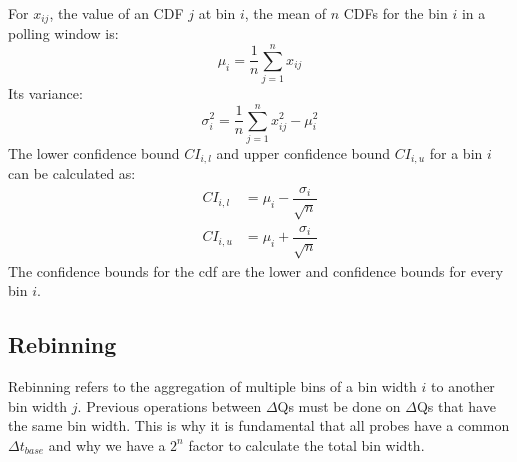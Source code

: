         For $x_{ij}$, the value of an CDF $j$ at bin $i$, the mean of $n$ CDFs for the bin $i$ in a polling window is:
            \begin{equation}
                \mu_i = \dfrac{1}{n} \sum_{j=1}^{n} x_{ij}
                \label{eq:mean_ecdf}
            \end{equation}
        Its variance:
            \begin{equation}
                \sigma^2_i = \dfrac{1}{n} \sum_{j=1}^{n} x^2_{ij} - \mu^2_i
                \label{eq:var_ecdf}
            \end{equation}
        The lower confidence bound $CI_{i, l}$ and upper confidence bound $CI_{i, u}$ for a bin $i$ can be calculated as:
        \begin{equation}
            \begin{split}
                CI_{i, l} &= \mu_i - \dfrac{\sigma_i}{\sqrt{n}} \\
                CI_{i, u} &= \mu_i + \dfrac{\sigma_i}{\sqrt{n}}
            \end{split}
            \label{eq:ci_i}
        \end{equation}
        The confidence bounds for the cdf are the lower and confidence bounds for every bin $i$.

        \subsection{Rebinning}
            Rebinning refers to the aggregation of multiple bins of a bin width $i$ to another bin width $j$. \cite{rebin}
            Previous operations between $\Delta$Qs must be done on $\Delta$Qs that have the same bin width. This is why it is fundamental that all probes have a common $\Delta t_{base}$ and why we have a $2^n$ factor to calculate the total bin width.

